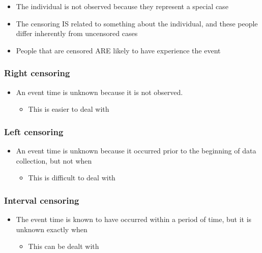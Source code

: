 \documentclass[
  letterpaper,
  DIV=11,
  numbers=noendperiod]{scrreprt}
\providecommand{\tightlist}{%
  \setlength{\itemsep}{0pt}\setlength{\parskip}{0pt}}\usepackage{longtable,booktabs,array}
\begin{document}
\begin{itemize}
\tightlist
\item
  The individual is not observed because they represent a special case
\item
  The censoring IS related to something about the individual, and these
  people differ inherently from uncensored cases
\item
  People that are censored ARE likely to have experience the event
\end{itemize}

\hypertarget{right-censoring}{%
\subsubsection{Right censoring}\label{right-censoring}}

\begin{itemize}
\tightlist
\item
  An event time is unknown because it is not observed.

  \begin{itemize}
  \tightlist
  \item
    This is easier to deal with
  \end{itemize}
\end{itemize}

\hypertarget{left-censoring}{%
\subsubsection{Left censoring}\label{left-censoring}}

\begin{itemize}
\tightlist
\item
  An event time is unknown because it occurred prior to the beginning of
  data collection, but not when

  \begin{itemize}
  \tightlist
  \item
    This is difficult to deal with
  \end{itemize}
\end{itemize}

\hypertarget{interval-censoring}{%
\subsubsection{Interval censoring}\label{interval-censoring}}

\begin{itemize}
\tightlist
\item
  The event time is known to have occurred within a period of time, but
  it is unknown exactly when

  \begin{itemize}
  \tightlist
  \item
    This can be dealt with
  \end{itemize}
\end{itemize}
\end{document}
